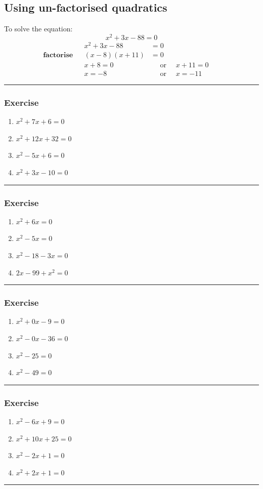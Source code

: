 \documentclass[a4paper,12pt]{article}
\newcommand\question{
	 \rule[0pt]{17cm}{0.5pt}\vspace{-0.5cm}
	\subsubsection{Exercise}

}
\newcommand\questionend{
	\rule[0pt]{17cm}{0.5pt}\vspace{0.0cm}\\
}
\begin{document}
\subsection{Using un-factorised quadratics}
To solve the equation:
$$x^2 + 3x -88 =0$$
\begin{align*}
	                          &&x^2 + 3x -88&=0&&\\
\textbf{factorise} &&(x-8)(x+11)&=0&&\\
                             &&x+8 = 0&\text{~~~~or~~~~} x+11=0&&\\
							&&x=-8  &\text{~~~~or~~~~} x=-11&&
\end{align*}

\question
\begin{multicols}{2}
	\begin{enumerate}[label=\normalsize \alph*)~~~]
\item $ x^2 + 7x + 6=0 $ 
\item $ x^2 + 12x + 32=0 $ 
\item $ x^2 - 5x + 6=0$ 
\item $ x^2 + 3x - 10=0 $ 
	\end{enumerate}
\end{multicols}
\question
\begin{multicols}{2}
	\begin{enumerate}[label=\normalsize \alph*)~~~]
	\item $ x^2 +6x =0$ 
	\item $ x^2 - 5x =0$ 
	\item $ x^2 - 18 - 3x =0$ 
	\item $ 2x - 99 + x^2=0$ 
	\end{enumerate}
\end{multicols}
\question
\begin{multicols}{2}
	\begin{enumerate}[label=\normalsize \alph*)~~~]
		\item $ x^2 + 0x -9 =0$ 
		\item $ x^2 - 0x -36 =0$ 
		\item $ x^2  - 25 =0$ 
		\item $ x^2 - 49=0$ 
	\end{enumerate}
\end{multicols}
\question
\begin{multicols}{2}
	\begin{enumerate}[label=\normalsize \alph*)~~~]
		\item $ x^2 - 6x + 9  =0$ 
		\item $ x^2 + 10x +25 =0$ 
		\item $ x^2  - 2x + 1 =0$ 
		\item $ x^2  + 2x + 1=0$ 
	\end{enumerate}
\end{multicols}
\questionend
\newpage
\end{document}
